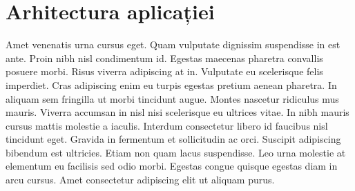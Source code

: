 \chapter{Arhitectura aplicației}

Amet venenatis urna cursus eget. Quam vulputate dignissim suspendisse in est ante. Proin nibh nisl condimentum id. Egestas maecenas pharetra convallis posuere morbi. Risus viverra adipiscing at in. Vulputate eu scelerisque felis imperdiet. Cras adipiscing enim eu turpis egestas pretium aenean pharetra. In aliquam sem fringilla ut morbi tincidunt augue. Montes nascetur ridiculus mus mauris. Viverra accumsan in nisl nisi scelerisque eu ultrices vitae. In nibh mauris cursus mattis molestie a iaculis. Interdum consectetur libero id faucibus nisl tincidunt eget. Gravida in fermentum et sollicitudin ac orci. Suscipit adipiscing bibendum est ultricies. Etiam non quam lacus suspendisse. Leo urna molestie at elementum eu facilisis sed odio morbi. Egestas congue quisque egestas diam in arcu cursus. Amet consectetur adipiscing elit ut aliquam purus.